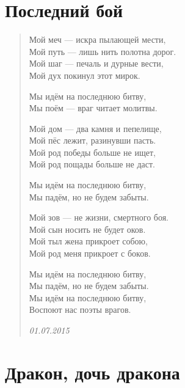 \section{Последний бой}

\begin{verse}
Мой меч --- искра пылающей мести,\\
Мой путь --- лишь нить полотна дорог.\\
Мой шаг --- печаль и дурные вести,\\
Мой дух покинул этот мирок.

Мы идём на последнюю битву,\\
Мы поём --- враг читает молитвы.

Мой дом --- два камня и пепелище,\\
Мой пёс лежит, разинувши пасть.\\
Мой род победы больше не ищет,\\
Мой род пощады больше не даст.

Мы идём на последнюю битву,\\
Мы падём, но не будем забыты.

Мой зов --- не жизни, смертного боя.\\
Мой сын носить не будет оков.\\
Мой тыл жена прикроет собою,\\
Мой род меня прикроет с боков.

Мы идём на последнюю битву,\\
Мы падём, но не будем забыты.\\
Мы идём на последнюю битву,\\
Воспоют нас поэты врагов.

\emph{01.07.2015}
\end{verse}
\newpage

\section{Дракон, дочь дракона}

